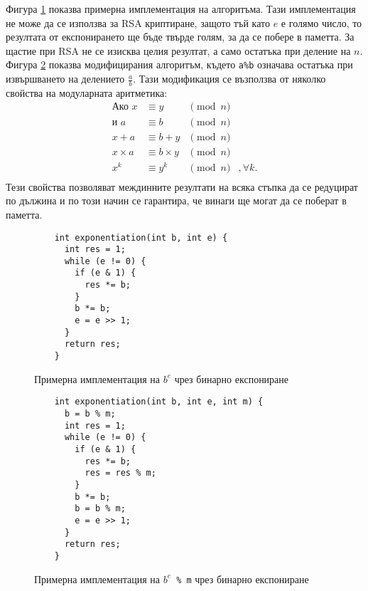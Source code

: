  Фигура \ref{fig:binexp} показва примерна имплементация на алгоритъма. Тази имплементация не може да се използва за RSA криптиране, защото тъй като $e$ е голямо число, то резултата от експонирането ще бъде твърде голям, за да се побере в паметта. За щастие при RSA не се изисква целия резултат, а само остатъка при деление на $n$. Фигура \ref{fig:binmodexp} показва модифицирания алгоритъм, където {\tt a\%b} означава остатъка при извършването на делението $\frac{a}{b}$. Тази модификация се възползва от няколко свойства на модуларната аритметика:
  \begin{equation}
    \begin{alignedat}{3}
      \textrm{Ако } x &\equiv y &\pmod{n}  \\
      \textrm{и } a &\equiv b &\pmod{n} \\
      \hline
      x + a &\equiv b + y &\pmod{n} \\
      x \times a &\equiv b \times y &\pmod{n} \\
      x^k &\equiv y^k &\pmod{n}&, \forall k. \\
    \end{alignedat}
    \label{modular-arithmetic-properties}
  \end{equation}
  Тези свойства позволяват междинните резултати на всяка стъпка да се редуцират по дължина и по този начин се гарантира, че винаги ще могат да се поберат в паметта.

  \begin{figure}[htpb]
    \caption{Примерна имплементация на $b^e$ чрез бинарно експониране}
    \label{fig:binexp}
    \begin{verbatim}
    int exponentiation(int b, int e) {
      int res = 1;
      while (e != 0) {
        if (e & 1) {
          res *= b;
        }
        b *= b;
        e = e >> 1;
      }
      return res;
    }
    \end{verbatim}
  \end{figure}

  \begin{figure}[htpb]
    \caption{Примерна имплементация на {\tt $b^e$ \% m} чрез бинарно експониране}
    \label{fig:binmodexp}
    \begin{verbatim}
    int exponentiation(int b, int e, int m) {
      b = b % m;
      int res = 1;
      while (e != 0) {
        if (e & 1) {
          res *= b;
          res = res % m;
        }
        b *= b;
        b = b % m;
        e = e >> 1;
      }
      return res;
    }
    \end{verbatim}
  \end{figure}

